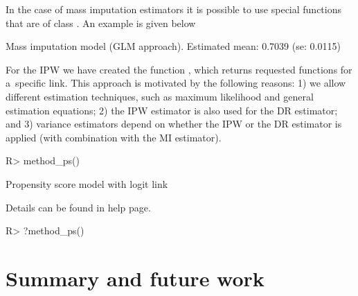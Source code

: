\documentclass[
]{jss}
\begin{document}
In the case of mass imputation estimators it is possible to use special
functions  that are of class .
An example is given below

\begin{CodeChunk}
\begin{CodeOutput}
Mass imputation model (GLM approach). Estimated mean: 0.7039 (se: 0.0115)
\end{CodeOutput}
\end{CodeChunk}

For the IPW we have created the function , which
returns requested functions for a~specific link. This approach is
motivated by the following reasons: 1) we allow different estimation
techniques, such as maximum likelihood and general estimation equations;
2) the IPW estimator is also used for the DR estimator; and 3) variance
estimators depend on whether the IPW or the DR estimator is applied
(with combination with the MI estimator).

\begin{CodeChunk}
\begin{CodeInput}
R> method_ps()
\end{CodeInput}
\begin{CodeOutput}
Propensity score model with logit link
\end{CodeOutput}
\end{CodeChunk}

Details can be found in help page.

\begin{CodeChunk}
\begin{CodeInput}
R> ?method_ps()
\end{CodeInput}
\end{CodeChunk}

\section{Summary and future work}\label{summary-and-future-work}
\end{document}
